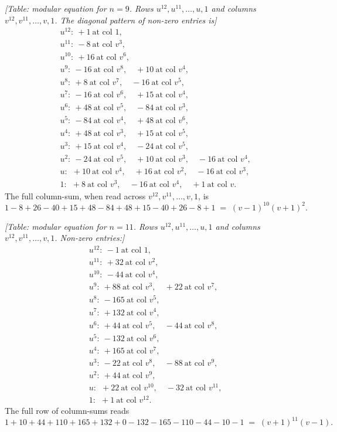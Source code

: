 \documentclass[11pt]{article}
\begin{document}
\textit{[Table: modular equation for $n=9$. Rows $u^{12}, u^{11}, \ldots, u, 1$
and columns $v^{12}, v^{11}, \ldots, v, 1$. The diagonal pattern of
non-zero entries is]}
\[
\begin{aligned}
&u^{12}: \ +1 \ \text{at col }1, \\
&u^{11}: \ -8 \ \text{at col }v^3, \\
&u^{10}: \ +16 \ \text{at col }v^6, \\
&u^9: \ -16 \ \text{at col }v^8,\quad +10 \ \text{at col }v^4, \\
&u^8: \ +8 \ \text{at col }v^7,\quad -16 \ \text{at col }v^5, \\
&u^7: \ -16 \ \text{at col }v^6,\quad +15 \ \text{at col }v^4, \\
&u^6: \ +48 \ \text{at col }v^5,\quad -84 \ \text{at col }v^3, \\
&u^5: \ -84 \ \text{at col }v^4,\quad +48 \ \text{at col }v^6, \\
&u^4: \ +48 \ \text{at col }v^3,\quad +15 \ \text{at col }v^5, \\
&u^3: \ +15 \ \text{at col }v^4,\quad -24 \ \text{at col }v^5, \\
&u^2: \ -24 \ \text{at col }v^5,\quad +10 \ \text{at col }v^3,\quad -16 \ \text{at col }v^4, \\
&u: \ \ +10 \ \text{at col }v^4,\quad +16 \ \text{at col }v^2,\quad -16 \ \text{at col }v^3, \\
&1: \ \ +8 \ \text{at col }v^3,\quad -16 \ \text{at col }v^4,\quad +1 \ \text{at col }v.
\end{aligned}
\]
The full column-sum, when read across $v^{12}, v^{11}, \ldots, v, 1$, is
\[
1 - 8 + 26 - 40 + 15 + 48 - 84 + 48 + 15 - 40 + 26 - 8 + 1
\;=\; (v - 1)^{10}(v + 1)^2.
\]

\medskip
\textit{[Table: modular equation for $n=11$. Rows $u^{12},u^{11},\ldots,u,1$
and columns $v^{12},v^{11},\ldots,v,1$. Non-zero entries:]}
\[
\begin{aligned}
&u^{12}: \ -1 \ \text{at col }1, \\
&u^{11}: \ +32 \ \text{at col }v^2, \\
&u^{10}: \ -44 \ \text{at col }v^4, \\
&u^9: \ +88 \ \text{at col }v^3,\quad +22 \ \text{at col }v^7, \\
&u^8: \ -165 \ \text{at col }v^5, \\
&u^7: \ +132 \ \text{at col }v^4, \\
&u^6: \ +44 \ \text{at col }v^5,\quad -44 \ \text{at col }v^8, \\
&u^5: \ -132 \ \text{at col }v^6, \\
&u^4: \ +165 \ \text{at col }v^7, \\
&u^3: \ -22 \ \text{at col }v^8,\quad -88 \ \text{at col }v^9, \\
&u^2: \ +44 \ \text{at col }v^9, \\
&u: \ \ +22 \ \text{at col }v^{10},\quad -32 \ \text{at col }v^{11}, \\
&1: \ \ +1 \ \text{at col }v^{12}.
\end{aligned}
\]
The full row of column-sums reads
\[
1 + 10 + 44 + 110 + 165 + 132 + 0 - 132 - 165 - 110 - 44 - 10 - 1 \;=\; (v+1)^{11}(v - 1).
\]
\end{document}
